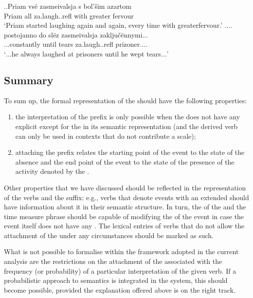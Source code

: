 \ex.\label{ex:za:laugh}\ag.\label{ex:za:laugh1}Priam vs\"{e} zasmeivalsja s bol'\v{s}im azartom\\
Priam all za.laugh..refl with greater fervour\\
\trans `Priam started laughing again and again, every time with greater\linebreak fervour.'
\bg.\label{ex:za:laugh2}$\ldots$postojanno do sl\"{e}z zasmeivalsja zaklju\v{c}\"{e}nnymi$\ldots$\\
$\ldots$constantly until tears za.laugh..refl prizoner.$\ldots$\\
\trans `$\ldots$he always laughed at prisoners until he wept tears$\ldots$'


\subsection{Summary}
To sum up, the formal representation of the   should have the following properties: 
\begin{enumerate}
\item the  interpretation of the prefix is only possible when the  does not have any explicit  except for the  in its semantic representation (and the derived verb can only be used in contexts that do not contribute a scale);
\item attaching the prefix  relates the starting point of the event to the state of the absence and the end point of the event to the state of the presence of the activity denoted by the .
\end{enumerate}

Other properties that we have discussed should be reflected in the representation of the verbs and the  suffix: e.g., verbs that denote events with an extended  should have information about it in their semantic structure. In turn, the  of the  and the time measure phrase should be capable of modifying the  of the event in case the event itself does not have any . The lexical entries of verbs that do not allow the attachment of the  under any circumstances should be marked as such.

What is not possible to formalise within the framework adopted in the current analysis are the restrictions on the attachment of the  associated with the frequency (or probability) of a particular interpretation of the given verb. If a probabilistic approach to semantics is integrated in the system, this should become possible, provided the explanation offered above is on the right track.

